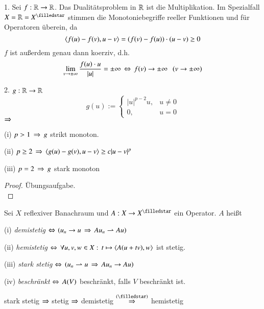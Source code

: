 \begin{description}
    \item{1.}
    Sei $f:\mathbb{R}\rightarrow\mathbb{R}$. Das Dualitätsproblem in $\mathbb{R}$ ist die Multiplikation. Im Spezialfall $X=\R=X^\star$
    stimmen die Monotoniebegriffe reeller Funktionen und für Operatoren überein, da
    \[
        \langle f(u)-f(v),u-v\rangle=(f(v)-f(u))\cdot(u-v)\geq 0
    \]
    $f$ ist außerdem genau dann koerziv, d.h.
    \[
        \lim_{v\rightarrow \pm \infty} \frac{f(u)\cdot u}{|u|}=\pm\infty \, \Leftrightarrow \, f(v)\rightarrow \pm \infty\hspace{.25cm}(v\rightarrow\pm
                \infty)
    \]
    \item{2.}
    $g:\mathbb{R}\rightarrow \mathbb{R}$
    \[
        g(u):=\begin{cases} |u|^{p-2}u, & u\neq 0\\ 0, & u=0 \end{cases}
    \]
    $\Rightarrow$ \begin{description}
        \item{(i)}
        $p>1 \, \Rightarrow \, g$ strikt monoton.
        \item{(ii)}
        $p\geq 2 \, \Rightarrow \, \langle g(u)-g(v),u-v\rangle \geq c|u-v|^p$
        \item{(iii)}
        $p=2 \, \Rightarrow \, g$ stark monoton
    \end{description}
    \begin{proof}
    Übungsaufgabe. \[ \]
    \end{proof}
\end{description}

\begin{defi}
    Sei $X$ reflexiver Banachraum und $A:X\ra X^\star$ ein Operator. $A$ heißt
    \begin{description}
    \item{(i)}
    \textit{demistetig} $\Leftrightarrow$ $\left( u_n\rightarrow u\, \Rightarrow \, Au_n\rightharpoonup Au \right)$
    \item{(ii)}
    \textit{hemistetig} $\Leftrightarrow \, \forall u,v,w \in X: \, t\mapsto \langle A(u+tv),w\rangle$ ist stetig.
    \item{(iii)}
    \textit{stark stetig} $\Leftrightarrow \, \left( u_n \rightharpoonup u\, \Rightarrow \, Au_n\rightarrow Au \right)$
    \item{(iv)}
    \textit{beschränkt} $\Leftrightarrow \, A(V)$ beschränkt, falls $V$ beschränkt ist. 
    \end{description}
\end{defi}

\begin{remark}
    stark stetig $\Rightarrow$ stetig $\Rightarrow$ demistetig $\overset{(\star)}{\Ra}$ hemistetig
\end{remark}

